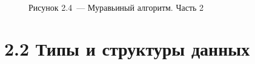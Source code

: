 \documentclass[12pt, a4paper]{report}
\begin{document}
	\begin{figure}[H]
		\caption*{Рисунок 2.4~--- Муравьиный алгоритм. Часть 2}
	\end{figure}
	
	\section*{2.2 Типы и структуры данных}
	
\end{document}
